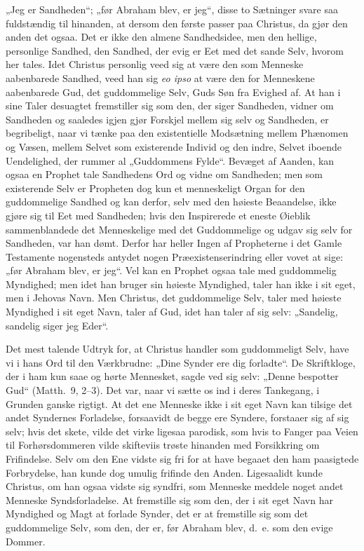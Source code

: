 \documentclass[12pt]{book}
\begin{document}
„Jeg er Sandheden“; „før Abraham blev, er jeg“, disse to Sætninger
svare saa fuldstændig til hinanden, at dersom den første passer paa
Christus, da gjør den anden det ogsaa. Det er ikke den almene
Sandhedsidee, men den hellige, personlige Sandhed, den Sandhed, der
evig er Eet med det sande Selv, hvorom her tales. Idet Christus
personlig veed sig at være den som Menneske aabenbarede Sandhed, veed
han sig \textit{eo ipso} at være den for Menneskene aabenbarede Gud,
det guddommelige Selv, Guds Søn fra Evighed af. At han i sine Taler
desuagtet fremstiller sig som den, der siger Sandheden, vidner om
Sandheden og saaledes igjen gjør Forskjel mellem sig selv og
Sandheden, er begribeligt, naar vi tænke paa den existentielle
Modsætning mellem Phænomen og Væsen, mellem Selvet som existerende
Individ og den indre, Selvet iboende Uendelighed, der rummer al
„Guddommens Fylde“. Bevæget af Aanden, kan ogsaa en Prophet tale
Sandhedens Ord og vidne om Sandheden; men som existerende Selv er
Propheten dog kun et menneskeligt Organ for den guddommelige Sandhed
og kan derfor, selv med den høieste Beaandelse, ikke gjøre sig til
Eet med Sandheden; hvis den Inspirerede et eneste Øieblik
sammenblandede det Menneskelige med det Guddommelige og udgav sig
selv for Sandheden, var han dømt. Derfor har heller Ingen af
Propheterne i det Gamle Testamente nogensteds antydet nogen
Præexistenserindring eller vovet at sige: „før Abraham blev, er
jeg“. Vel kan en Prophet ogsaa tale med guddommelig Myndighed; men
idet han bruger sin høieste Myndighed, taler han ikke i sit eget, men
i Jehovas Navn. Men Christus, det guddommelige Selv, taler med
høieste Myndighed i sit eget Navn, taler af Gud, idet han taler af
sig selv: „Sandelig, sandelig siger jeg Eder“.

Det mest talende Udtryk for, at Christus handler som guddommeligt
Selv, have vi i hans Ord til den Værkbrudne: „Dine Synder ere dig
forladte“. De Skriftkloge, der i ham kun saae og hørte Mennesket,
sagde ved sig selv: „Denne bespotter Gud“ (Matth.\ 9, 2--3). Det var,
naar vi sætte os ind i deres Tankegang, i Grunden ganske rigtigt. At
det ene Menneske ikke i sit eget Navn kan tilsige det andet
Syndernes Forladelse, forsaavidt de begge ere Syndere, forstaaer sig
af sig selv; hvis det skete, vilde det virke ligesaa parodisk, som
hvis to Fanger paa Veien til Forhørsdommeren vilde skifteviis trøste
hinanden med Forsikkring om Frifindelse. Selv om den Ene vidste sig
fri for at have begaaet den ham paasigtede Forbrydelse, han kunde dog
umulig frifinde den Anden. Ligesaalidt kunde Christus, om han ogsaa
vidste sig syndfri, som Menneske meddele noget andet Menneske
Syndsforladelse. At fremstille sig som den, der i sit eget Navn har
Myndighed og Magt at forlade Synder, det er at fremstille sig som det
guddommelige Selv, som den, der er, før Abraham blev, d.\ e. som den
evige Dommer.
\end{document}
